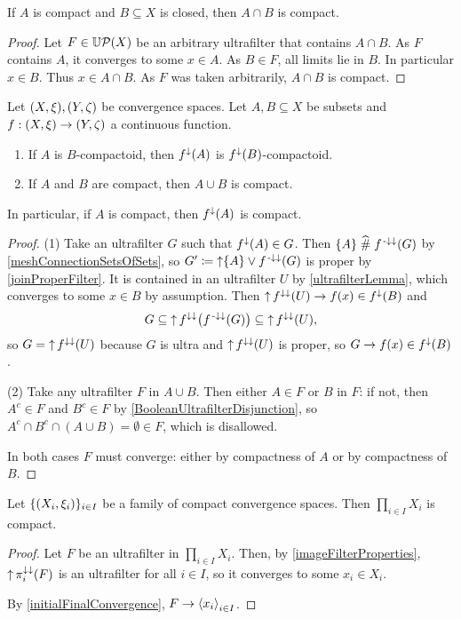 \begin{proposition} \label{compactClosedIntersectionCompact}
If $A$ is compact and $B\subseteq X$ is closed, then $A\cap B$ is compact.
\end{proposition}
\begin{proof}
Let $F\in \operatorname{\mathbb{U}\mathcal{P}}(X)$ be an arbitrary ultrafilter that contains $A\cap B$. As $F$ contains $A$, it converges to some $x\in A$. As $B\in F$, all limits lie in $B$. In particular $x\in B$. Thus $x\in A\cap B$. As $F$ was taken arbitrarily, $A\cap B$ is compact.
\end{proof}

\begin{proposition} \label{compactConstructions}
Let $\sSet{X,\xi}, \sSet{Y,\zeta}$ be convergence spaces. Let $A,B\subseteq X$ be subsets and $f: \sSet{X,\xi}\to \sSet{Y,\zeta}$ a continuous function.
\begin{enumerate}
\item If $A$ is $B$-compactoid, then $f^\downarrow(A)$ is $f^\downarrow(B)$-compactoid.
\item If $A$ and $B$ are compact, then $A\cup B$ is compact.
\end{enumerate}
\end{proposition}
In particular, if $A$ is compact, then $f^\downarrow(A)$ is compact.
\begin{proof}
(1) Take an ultrafilter $G$ such that $f^{\downarrow}(A)\in G$. Then $\{A\}\mathrel{\widehat{\#}} f^{{\text{\hspace{0.15em}-}\downarrow}\downarrow}(G)$ by \ref{meshConnectionSetsOfSets}, so $G' \coloneqq \operatorname{\uparrow}\{A\}\vee f^{{\text{\hspace{0.15em}-}\downarrow}\downarrow}(G)$ is proper by \ref{joinProperFilter}. It is contained in an ultrafilter $U$ by \ref{ultrafilterLemma}, which converges to some $x\in B$ by assumption. Then $\operatorname{\uparrow} f^{\downarrow\downarrow}(U) \to f(x)\in f^\downarrow(B)$ and
\[ G \subseteq \operatorname{\uparrow} f^{\downarrow\downarrow}\big(f^{{\text{\hspace{0.15em}-}\downarrow}\downarrow}(G)\big) \subseteq \operatorname{\uparrow} f^{\downarrow\downarrow}(U), \]
so $G = \operatorname{\uparrow} f^{\downarrow\downarrow}(U)$ because $G$ is ultra and $\operatorname{\uparrow} f^{\downarrow\downarrow}(U)$ is proper, so $G\to f(x)\in f^\downarrow(B)$.

(2) Take any ultrafilter $F$ in $A\cup B$. Then either $A\in F$ or $B$ in $F$: if not, then $A^c\in F$ and $B^c \in F$ by \ref{BooleanUltrafilterDisjunction}, so $A^c\cap B^c\cap (A\cup B) = \emptyset \in F$, which is disallowed.

In both cases $F$ must converge: either by compactness of $A$ or by compactness of $B$.
\end{proof}

\begin{theorem}[Tychonoff] \label{TychonoffsTheorem}
Let $\{\sSet{X_i, \xi_i}\}_{i\in I}$ be a family of compact convergence spaces. Then $\prod_{i\in I}X_i$ is compact.
\end{theorem}
\begin{proof}
Let $F$ be an ultrafilter in $\prod_{i\in I}X_i$. Then, by \ref{imageFilterProperties}, $\operatorname{\uparrow} \pi_i^{\downarrow\downarrow}(F)$ is an ultrafilter for all $i\in I$, so it converges to some $x_i\in X_i$.

By \ref{initialFinalConvergence}, $F\to \left\langle x_i \right\rangle_{i\in I}$.
\end{proof}

